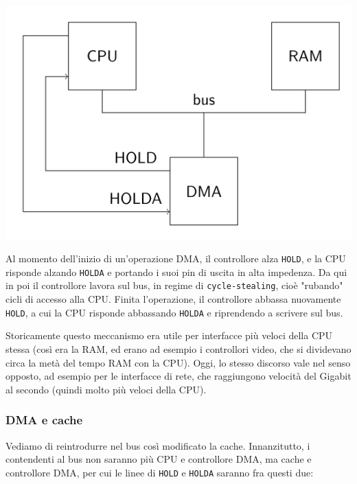 \documentclass[a4paper,11pt]{article}
\begin{document}
\begin{center}
	\includegraphics[scale=0.5]{../figures/dma_base.png}
\end{center}

Al momento dell'inizio di un'operazione DMA, il controllore alza \lstinline|HOLD|, e la CPU risponde alzando \lstinline|HOLDA| e portando i suoi pin di uscita in alta impedenza.
Da qui in poi il controllore lavora sul bus, in regime di \lstinline|cycle-stealing|, cioè "rubando" cicli di accesso alla CPU.
Finita l'operazione, il controllore abbassa nuovamente \lstinline|HOLD|, a cui la CPU risponde abbassando \lstinline|HOLDA| e riprendendo a scrivere sul bus.

Storicamente questo meccanismo era utile per interfacce più veloci della CPU stessa (così era la RAM, ed erano ad esempio i controllori video, che si dividevano circa la metà del tempo RAM con la CPU).
Oggi, lo stesso discorso vale nel senso opposto, ad esempio per le interfacce di rete, che raggiungono velocità del Gigabit al secondo (quindi molto più veloci della CPU).

\subsubsection{DMA e cache}
Vediamo di reintrodurre nel bus così modificato la cache.
Innanzitutto, i contendenti al bus non saranno più CPU e controllore DMA, ma cache e controllore DMA, per cui le linee di \lstinline|HOLD| e \lstinline|HOLDA| saranno fra questi due:
\end{document}
